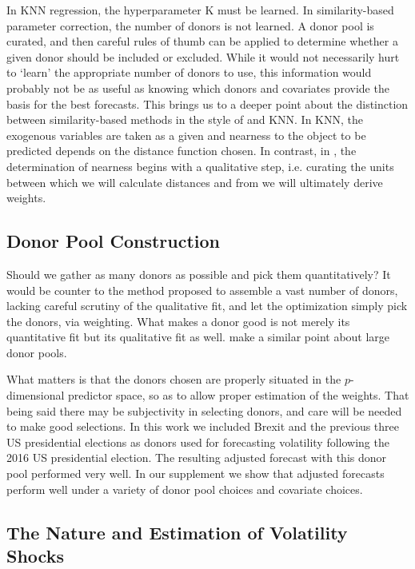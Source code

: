 \documentclass[11pt,3p,review,authoryear]{elsarticle}
\theoremstyle{definition}
\begin{document}
In KNN regression, the hyperparameter K must be learned.  In similarity-based parameter correction, the number of donors is not learned.  A donor pool is curated, and then careful rules of thumb can be applied to determine whether a given donor should be included or excluded.  While it would not necessarily hurt to `learn' the appropriate number of donors to use, this information would probably not be as useful as knowing which donors and covariates provide the basis for the best forecasts.  This brings us to a deeper point about the distinction between similarity-based methods in the style of \citet{lin2021minimizing} and KNN.  In KNN, the exogenous variables are taken as a given and nearness to the object to be predicted depends on the distance function chosen.  In contrast, in \citet{lin2021minimizing}, the determination of nearness begins with a qualitative step, i.e. curating the units between which we will calculate distances and from we will ultimately derive weights.

\subsection{Donor Pool Construction}

Should we gather as many donors as possible and pick them quantitatively?  It would be counter to the method proposed to assemble a vast number of donors, lacking careful scrutiny of the qualitative fit, and let the optimization simply pick the donors, via weighting.  What makes a donor good is not merely its quantitative fit but its qualitative fit as well.  \citet{abadie2022synthetic} make a similar point about large donor pools.  

What matters is that the donors chosen are properly situated in the $p$-dimensional predictor space, so as to allow proper estimation of the weights.  %
That being said there may be subjectivity in selecting donors, and care will be needed to make good selections. In this work we included Brexit and the previous three US presidential elections as donors used for forecasting volatility following the 2016 US presidential election. The resulting adjusted forecast with this donor pool performed very well. In our supplement we show that adjusted forecasts perform well under a variety of donor pool choices and covariate choices.


\subsection{The Nature and Estimation of Volatility Shocks}
\end{document}
